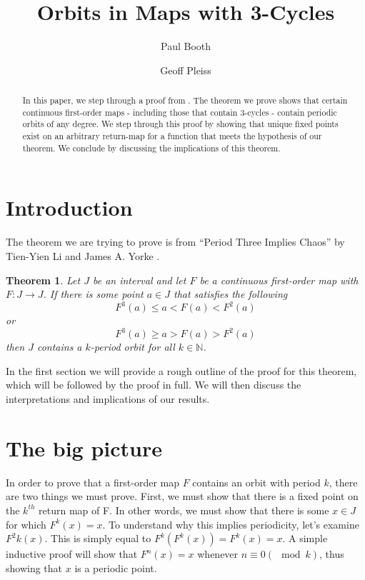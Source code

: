 \documentclass[12pt]{IEEEtran}
\title{Orbits in Maps with 3-Cycles}
\author{
  Paul Booth \\
  \and
  Geoff Pleiss
}
\date{}
\newtheorem{thm}{Theorem}
\begin{document}
  \maketitle


\begin{abstract}
In this paper, we step through a proof from \cite{li}. The theorem we prove shows that certain continuous first-order maps - including those that contain 3-cycles - contain periodic orbits of any degree. We step through this proof by showing that unique fixed points exist on an arbitrary return-map for a function that meets the hypothesis of our theorem. We conclude by discussing the implications of this theorem.
\end{abstract}


\section{Introduction}

The theorem we are trying to prove is from ``Period Three Implies Chaos'' by Tien-Yien Li and James A. Yorke \cite{li}.

\begin{thm}
\label{thm:mainthm}
	Let $J$ be an interval and let $F$ be a continuous first-order map with $F : J \rightarrow J$. If there is some point $a \in J$ that satisfies the following
	\[ F^3\left(a\right) \leq a < F\left(a\right) < F^2\left(a\right) \]
	or
	\[ F^3\left(a\right) \geq a > F\left(a\right) > F^2\left(a\right) \]
	then $J$ contains a $k$-period orbit for all $k \in \mathbb{N}$.
\end{thm}

In the first section we will provide a rough outline of the proof for this theorem, which will be followed by the proof in full. We will then discuss the interpretations and implications of our results.



\section{The big picture}
\label{sec:thebigpic}

In order to prove that a first-order map $F$ contains an orbit with period $k$, there are two things we must prove. First, we must show that there is a fixed point on the $k^{th}$ return map of F. In other words, we must show that there is some $x \in J$ for which $F^k \left( x \right) = x$. To understand why this implies periodicity, let's examine $F^2k \left( x \right)$. This is simply equal to $F^k \left( F^k \left( x \right) \right) = F^k \left( x \right) = x$. A simple inductive proof will show that $F^n \left( x \right) = x$ whenever $n \equiv 0 \left(\mod k \right)$, thus showing that $x$ is a periodic point.
\end{document}
